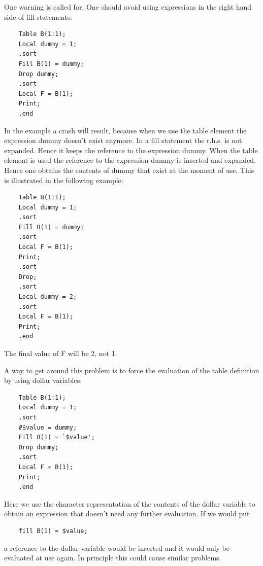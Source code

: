 \noindent One warning is called for. One should avoid using 
expressions in the right hand side of fill statements:
\begin{verbatim}
    Table B(1:1);
    Local dummy = 1;
    .sort
    Fill B(1) = dummy;
    Drop dummy;
    .sort
    Local F = B(1);
    Print;
    .end
\end{verbatim}
In the example a crash will result, because when we use the table element 
the expression dummy doesn't exist anymore. In a fill statement the r.h.s. 
is not expanded. Hence it keeps the reference to the expression dummy. When 
the table element is used the reference to the expression dummy is inserted 
and expanded. Hence one obtains the contents of dummy that exist at the 
moment of use. This is illustrated in the following example:
\begin{verbatim}
    Table B(1:1);
    Local dummy = 1;
    .sort
    Fill B(1) = dummy;
    .sort
    Local F = B(1);
    Print;
    .sort
    Drop;
    .sort
    Local dummy = 2;
    .sort
    Local F = B(1);
    Print;
    .end
\end{verbatim}
The final value of F will be 2, not 1.

\noindent A way to get around this problem is to force the evaluation of 
the table definition by using dollar 
variables:
\begin{verbatim}
    Table B(1:1);
    Local dummy = 1;
    .sort
    #$value = dummy;
    Fill B(1) = `$value';
    Drop dummy;
    .sort
    Local F = B(1);
    Print;
    .end
\end{verbatim}
Here we use the character representation of the contents of the dollar 
variable to obtain an expression that doesn't need any further evaluation. 
If we would put
\begin{verbatim}
    fill B(1) = $value;
\end{verbatim}
a reference to the dollar variable would be inserted and it would only be 
evaluated at use again. In principle this could cause similar problems.

